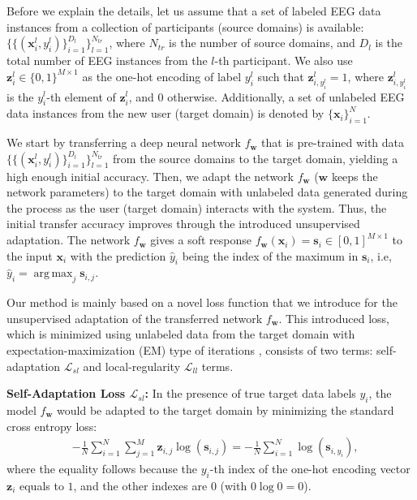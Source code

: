 \documentclass[12pt]{iopart}
\DeclareMathOperator*{\argmax}{arg\,max}
\newcommand{\matr}[1]{\mathbf{#1}}
\begin{document}
Before we explain the details, let us assume that a set of labeled EEG data instances from a collection of participants (source domains) is available: $\{\{(\matr{x}_i^l,y_i^l)\}_{i=1}^{D_l}\}_{l=1}^{N_{tr}}$, where $N_{tr}$ is the number of source domains, and $D_l$ is the total number of EEG instances {from the $l$-th participant}. We also use $\matr{z}^l_i \in \{0,1\}^{M\times 1}$ as {the one-hot encoding} of label $y^l_i$ such that $\matr{z}^l_{i,y^l_i}=1$, where $\matr{z}^l_{i,y^l_i}$ is the $y^l_i$-th element of $\matr{z}^l_i$, and $0$ otherwise. Additionally, a set of unlabeled EEG data instances from the new user (target domain) is denoted by $\{\matr{x}_i\}_{i=1}^{N}$. 

{We start by transferring a deep neural network $f_\matr{w}$ that is pre-trained with data $\{\{(\matr{x}_i^l,y_i^l)\}_{i=1}^{D_l}\}_{l=1}^{N_{tr}}$ from the source domains to the target domain, yielding a high enough initial accuracy.} Then, we adapt the network $f_\matr{w}$ ($\matr{w}$ keeps the network parameters) to the target domain with unlabeled data generated during the process as the user (target domain) interacts with the system. Thus, the initial transfer accuracy improves through the introduced unsupervised adaptation. The network $f_\matr{w}$ gives a soft response $f_\matr{w}(\matr{x}_i)=\matr{s}_i\in[0,1]^{M\times1}$ to the input $\matr{x}_i$ with the prediction $\hat{y}_i$ being the index of the maximum in $\matr{s}_i$, i.e, $\hat{y}_i = \argmax_j \matr{s}_{i,j}$.


Our method is mainly based on a novel loss function that we introduce for the unsupervised adaptation of the transferred network $f_\matr{w}$. This introduced loss, which is minimized using unlabeled data from the target domain with expectation-maximization (EM) type of iterations \cite{EM_algorithm}, consists of two terms: self-adaptation $\mathcal{L}_{sl}$ and local-regularity $\mathcal{L}_{{ll}}$ terms.


{\bf Self-Adaptation Loss $\mathcal{L}_{sl}$: } In the presence of true target data labels $y_i$, the model $f_\matr{w}$ would be adapted to the target domain by minimizing the standard cross entropy loss:
\begin{align*}
&-\frac{1}{N}\sum_{i=1}^{N}\sum_{j=1}^{M} \matr{z}_{i,j}\log(\matr{s}_{i,j})=-\frac{1}{N}\sum_{i=1}^{N} \log(\matr{s}_{i,y_i}),
\end{align*}
where the equality follows because the $y_i$-th index of the one-hot encoding vector $\matr{z}_i$ equals to $1$, and the other indexes are $0$ (with $0\log0=0$).
\end{document}
